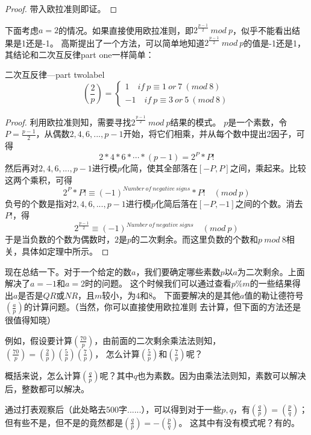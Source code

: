 \begin{proof}
带入欧拉准则即证。
\end{proof}

\vbox{}

下面考虑$a=2$的情况。如果直接使用欧拉准则，即$2^{\frac{p-1}{2}} \ mod \ p$，似乎不能看出结果是1还是-1。
高斯提出了一个方法，可以简单地知道$2^{\frac{p-1}{2}} \ mod \ p$的值是-1还是1，其结论和二次互反律part one一样简单：


\begin{theorem}{二次互反律---part two}{label}
$$
\left(  \frac{2}{p}  \right)= \left\{\begin{matrix}
1   \quad if\ p\equiv 1\ or\ 7 \ (mod \ 8) \\ 
-1 \quad if\ p\equiv 3\ or\ 5\ (mod \ 8)
\end{matrix}\right.
$$
\end{theorem}

\begin{proof}
利用欧拉准则知，需要寻找$2^{\frac{p-1}{2}} \ mod \ p$结果的模式。
$p$是一个素数，令$P=\frac{p-1}{2}$，从偶数$2,4,6,...,p-1$开始，将它们相乘，并从每个数中提出2因子，可得
$$
2*4*6*\cdots*(p-1)=2^P*P!
$$
然后再对$2,4,6,...,p-1$进行模$p$化简，使其全部落在$[-P,P]$之间，乘起来。比较这两个乘积，可得
$$
2^P*P!\equiv (-1)^{Number\ of\ negative\ signs}* P! \quad (mod \ p)
$$
负号的个数是指对$2,4,6,...,p-1$进行模$p$化简后落在$[-P,-1]$之间的个数。消去$P!$，得
$$
2^{\frac{p-1}{2}}\equiv  (-1)^{Number\ of\ negative\ signs}  \quad  (mod \ p)
$$
于是当负数的个数为偶数时，$2$是$p$的二次剩余。而这里负数的个数和$p\ mod\ 8$相关，具体如定理中所示。
\end{proof}

\vbox{}

现在总结一下。对于一个给定的数$a$，我们要确定哪些素数$p$以$a$为二次剩余。上面解决了$a=-1$和$a=2$时的问题。
这个时候我们可以通过查看$p\%m$的一些结果得出$a$是否是$QR$或$NR$，且$m$较小，为$4$和$8$。
下面要解决的是其他$a$值的勒让德符号$(\frac{a}{p})$的计算问题。（{\heiti 当然，你可以直接使用欧拉准则
去计算}，但下面的方法还是很值得知晓）

例如，假设要计算$(\frac{70}{p})$，由前面的二次剩余乘法法则知，$(\frac{70}{p})=(\frac{2}{p})(\frac{5}{p})(\frac{7}{p})$，
怎么计算$(\frac{5}{p})$和$(\frac{7}{p})$呢？

概括来说，怎么计算$(\frac{q}{p})$呢？其中$q$也为素数。因为由乘法法则知，素数可以解决后，整数都可以解决。

通过打表观察后（此处略去500字......），可以得到对于一些$p,q$，有$\left( \frac{q}{p} \right)=\left( \frac{p}{q} \right)$；但有些不是，但不是的竟然都是$\left( \frac{q}{p} \right)=-\left( \frac{p}{q} \right)$。
这其中有没有模式呢？有的。

